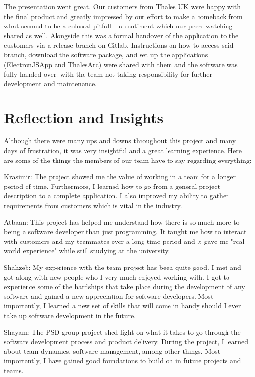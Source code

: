 \documentclass{l3proj}
\begin{document}
The presentation went great. Our customers from Thales UK were happy with the final product and greatly impressed by our effort to make a comeback from what seemed to be a colossal pitfall – a sentiment which our peers watching shared as well. Alongside this was a formal handover of the application to the customers via a release branch on Gitlab. Instructions on how to access said branch, download the software package, and set up the applications (ElectronJSApp and ThalesArc) were shared with them and the software was fully handed over, with the team not taking responsibility for further development and maintenance.


\section{Reflection and Insights}

Although there were many ups and downs throughout this project and many days of frustration, it was very insightful and a great learning experience. Here are some of the things the members of our team have to say regarding everything:

Krasimir: The project showed me the value of working in a team for a longer period of time. Furthermore, I learned how to go from a general project description to a complete application. I also improved my ability to gather requirements from customers which is vital in the industry.

Atbaan: This project has helped me understand how there is so much more to being a software developer than just programming. It taught me how to interact with customers and my teammates over a long time period and it gave me "real-world experience" while still studying at the university.

Shahzeb: My experience with the team project has been quite good. I met and got along with new people who I very much enjoyed working with. I got to experience some of the hardships that take place during the development of any software and gained a new appreciation for software developers. Most importantly, I learned a new set of skills that will come in handy should I ever take up software development in the future.

Shayam: The PSD group project shed light on what it takes to go through the software development process and product delivery. During the project, I learned about team dynamics, software management, among other things. Most importantly, I have gained good foundations to build on in future projects and teams.
\end{document}
